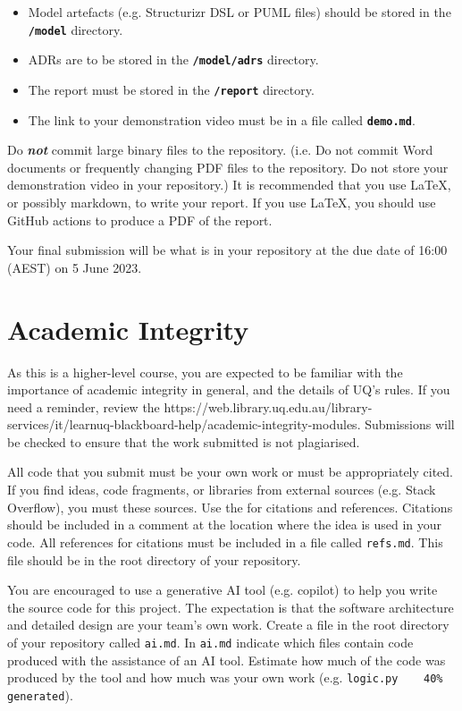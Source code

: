 \documentclass{csse4400}
\begin{document}
\begin{itemize}
    \item Model artefacts (e.g. Structurizr DSL or PUML files) should be stored in the \textbf{\texttt{/model}} directory.
    \item ADRs are to be stored in the \textbf{\texttt{/model/adrs}} directory.
    \item The report must be stored in the \textbf{\texttt{/report}} directory.
    \item The link to your demonstration video must be in a file called \textbf{\texttt{demo.md}}.
\end{itemize}

Do \textbf{\emph{not}} commit large binary files to the repository.
(i.e. Do not commit Word documents or frequently changing PDF files to the repository.
Do not store your demonstration video in your repository.)
It is recommended that you use LaTeX, or possibly markdown, to write your report.
If you use LaTeX, you should use GitHub actions to produce a PDF of the report.

Your final submission will be what is in your repository at the due date of 16:00 (AEST) on 5 June 2023.


\section{Academic Integrity}
As this is a higher-level course, you are expected to be familiar with the importance of academic integrity in general, and the details of UQ's rules.
If you need a reminder, review the 
{https://web.library.uq.edu.au/library-services/it/learnuq-blackboard-help/academic-integrity-modules}.
Submissions will be checked to ensure that the work submitted is not plagiarised.

All code that you submit must be your own work or must be appropriately cited.
If you find ideas, code fragments, or libraries from external sources (e.g. Stack Overflow), you must  these sources.
Use the  for citations and references.
Citations should be included in a comment at the location where the idea is used in your code.
All references for citations must be included in a file called \texttt{refs.md}.
This file should be in the root directory of your repository.

You are encouraged to use a generative AI tool (e.g. copilot) to help you write the source code for this project.
The expectation is that the software architecture and detailed design are your team's own work.
Create a file in the root directory of your repository called \texttt{ai.md}.
In \texttt{ai.md} indicate which files contain code produced with the assistance of an AI tool.
Estimate how much of the code was produced by the tool and how much was your own work
(e.g. \texttt{logic.py ~~~40\% generated}).
\end{document}
